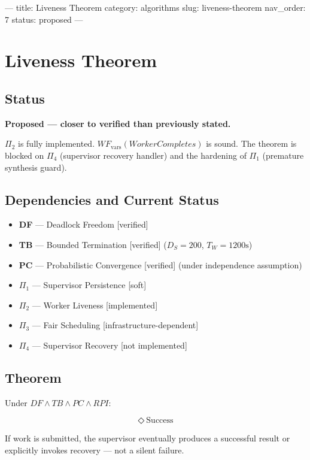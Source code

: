 ---
title: Liveness Theorem
category: algorithms
slug: liveness-theorem
nav_order: 7
status: proposed
---

\section{Liveness Theorem}

\subsection*{Status}

\textbf{Proposed — closer to verified than previously stated.}

$\Pi_2$ is fully implemented. $WF_{\text{vars}}(WorkerCompletes)$ is sound.
The theorem is blocked on $\Pi_4$ (supervisor recovery handler) and
the hardening of $\Pi_1$ (premature synthesis guard).

\subsection*{Dependencies and Current Status}

\begin{itemize}
  \item \textbf{DF} — Deadlock Freedom [verified]
  \item \textbf{TB} — Bounded Termination [verified] ($D_S=200$, $T_W=1200\text{s}$)
  \item \textbf{PC} — Probabilistic Convergence [verified] (under independence assumption)
  \item \textbf{$\Pi_1$} — Supervisor Persistence [soft]
  \item \textbf{$\Pi_2$} — Worker Liveness [implemented]
  \item \textbf{$\Pi_3$} — Fair Scheduling [infrastructure-dependent]
  \item \textbf{$\Pi_4$} — Supervisor Recovery [not implemented]
\end{itemize}

\subsection*{Theorem}

Under $DF \wedge TB \wedge PC \wedge RPI$:

\[ \Diamond\ \text{Success} \]

If work is submitted, the supervisor eventually produces a successful result
or explicitly invokes recovery — not a silent failure.

